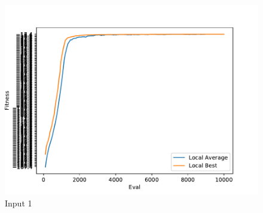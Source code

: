 \documentclass{standalone}
\begin{document}
\begin{figure}[!htb]
	\caption{Input 1}
	\label{fig:graph_1019}
	\includegraphics[width=\textwidth]{../graphs/graphs/1019.pdf}
\end{figure}
\end{document}

